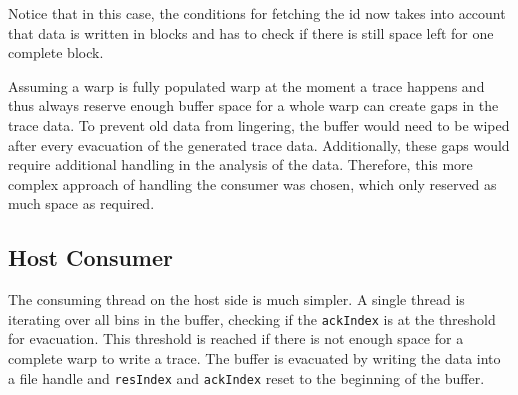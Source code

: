 	Notice that in this case, the conditions for fetching the id now takes into account that data is written in blocks and has to check if there is still space left for one complete block. 
	
	Assuming a warp is fully populated warp at the moment a trace happens and thus always reserve enough buffer space for a whole warp can create gaps in the trace data. To prevent old data from lingering, the buffer would need to be wiped after every evacuation of the
	generated trace data. Additionally, these gaps would require additional handling in the analysis of the data.
	Therefore, this more complex approach of handling the consumer was chosen, which only reserved as much space as required.

	
\subsection{Host Consumer}\label{host-cons}
	The consuming thread on the host side is much simpler. A single thread is iterating over all bins in the buffer, checking if the
	\verb|ackIndex| is at the threshold for evacuation. This threshold is reached if there is not enough space for a complete warp to
	write a trace.
	The buffer is evacuated by writing the data into a file handle and \verb|resIndex| and \verb|ackIndex| reset to the beginning of the buffer.

